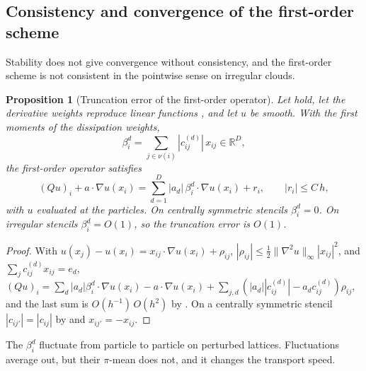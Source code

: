 \documentclass[11pt,a4paper]{article}
\theoremstyle{plain}
\newtheorem{proposition}[theorem]{Proposition}
\theoremstyle{definition}
\theoremstyle{remark}
\numberwithin{equation}{section}
\newcommand{\R}{\mathbb{R}}
\newcommand{\nb}{\nu}
\newcommand{\A}[1]{\cite[#1]{Addendum}}
\begin{document}
\subsection{Consistency and convergence of the first-order scheme}\label{sec:drift}

Stability does not give convergence without consistency, and the first-order scheme is not consistent in the pointwise sense on irregular clouds.

\begin{proposition}[Truncation error of the first-order operator]\label{prop:consistency}
Let \A{Ass.~2.1} hold, let the derivative weights reproduce linear functions \A{Lem.~3.3(i)}, and let $u$ be smooth. With the first moments of the dissipation weights,
\begin{equation}\label{eq:beta}
\beta^{d}_i=\sum_{j\in\nb(i)}|c^{(d)}_{ij}|\,x_{ij}\in\R^D,
\end{equation}
the first-order operator satisfies
\begin{equation}\label{eq:trunc}
(Qu)_i+a\cdot\nabla u(x_i)=\sum_{d=1}^D|a_d|\,\beta^{d}_i\cdot\nabla u(x_i)+r_i,\qquad|r_i|\le C\,h,
\end{equation}
with $u$ evaluated at the particles. On centrally symmetric stencils $\beta^d_i=0$. On irregular stencils $\beta^d_i=O(1)$, so the truncation error is $O(1)$.
\end{proposition}

\begin{proof}
With $u(x_j)-u(x_i)=x_{ij}\cdot\nabla u(x_i)+\rho_{ij}$, $|\rho_{ij}|\le\tfrac12\|\nabla^2u\|_\infty|x_{ij}|^2$, and $\sum_jc^{(d)}_{ij}x_{ij}=e_d$,
$(Qu)_i=\sum_d|a_d|\beta^d_i\cdot\nabla u(x_i)-a\cdot\nabla u(x_i)+\sum_{j,d}(|a_d||c^{(d)}_{ij}|-a_dc^{(d)}_{ij})\rho_{ij}$, and the last sum is $O(h^{-1})\,O(h^2)$ by \A{Lem.~3.5}. On a centrally symmetric stencil $|c_{ij'}|=|c_{ij}|$ by \A{Lem.~3.7(i)} and $x_{ij'}=-x_{ij}$.
\end{proof}

The $\beta^d_i$ fluctuate from particle to particle on perturbed lattices. Fluctuations average out, but their $\pi$-mean does not, and it changes the transport speed.
\end{document}
